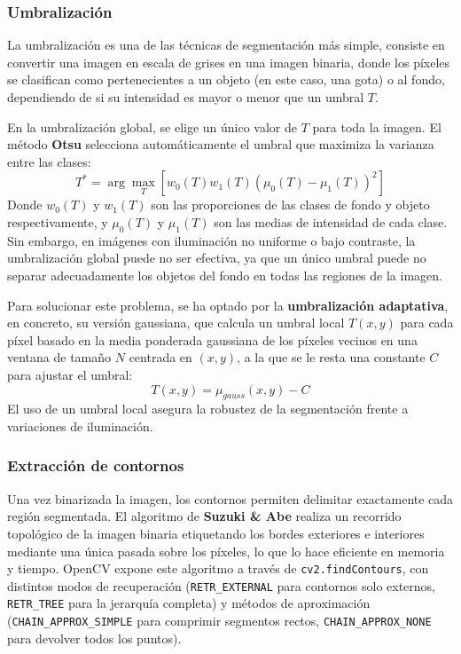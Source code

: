 \subsubsection{Umbralización}

La umbralización es una de las técnicas de segmentación más simple, consiste en convertir una imagen en escala de grises en una imagen binaria, donde los píxeles se clasifican como pertenecientes a un objeto (en este caso, una gota) o al fondo, dependiendo de si su intensidad es mayor o menor que un umbral $T$.

En la umbralización global, se elige un único valor de $T$ para toda la imagen. El método \textbf{Otsu} \cite{otsu1979} selecciona automáticamente el umbral que maximiza la varianza entre las clases:
\begin{equation}
    T^{*} = \arg\max_T \left[ w_{0}(T)w_{1}(T)(\mu_{0}(T)-\mu_{1}(T))^2\right]
\end{equation}
Donde $w_{0}(T)$ y $w_{1}(T)$ son las proporciones de las clases de fondo y objeto respectivamente, y $\mu_{0}(T)$ y $\mu_{1}(T)$ son las medias de intensidad de cada clase. Sin embargo, en imágenes con iluminación no uniforme o bajo contraste, la umbralización global puede no ser efectiva, ya que un único umbral puede no separar adecuadamente los objetos del fondo en todas las regiones de la imagen.

Para solucionar este problema, se ha optado por la \textbf{umbralización adaptativa}, en concreto, su versión gaussiana, que calcula un umbral local $T(x,y)$
para cada píxel basado en la media ponderada gaussiana de los píxeles vecinos en una ventana de tamaño $N$ centrada en $(x,y)$, a la que se le resta una constante $C$ para ajustar el umbral:
\begin{equation}
    T(x,y) = \mu_{gauss}(x, y) - C
\end{equation}
El uso de un umbral local asegura la robustez de la segmentación frente a variaciones de iluminación.

\subsubsection{Extracción de contornos}
Una vez binarizada la imagen, los contornos permiten delimitar exactamente cada región segmentada. El algoritmo de \textbf{Suzuki \& Abe} \cite{SUZUKI198532} realiza un recorrido topológico de la imagen binaria etiquetando los bordes exteriores e interiores mediante una única pasada sobre los píxeles, lo que lo hace eficiente en memoria y tiempo. OpenCV expone este algoritmo a través de \texttt{cv2.findContours}, con distintos modos de recuperación (\texttt{RETR\_EXTERNAL} para contornos solo externos, \texttt{RETR\_TREE} para la jerarquía completa) y métodos de aproximación (\texttt{CHAIN\_APPROX\_SIMPLE} para comprimir segmentos rectos, \texttt{CHAIN\_APPROX\_NONE} para devolver todos los puntos).

